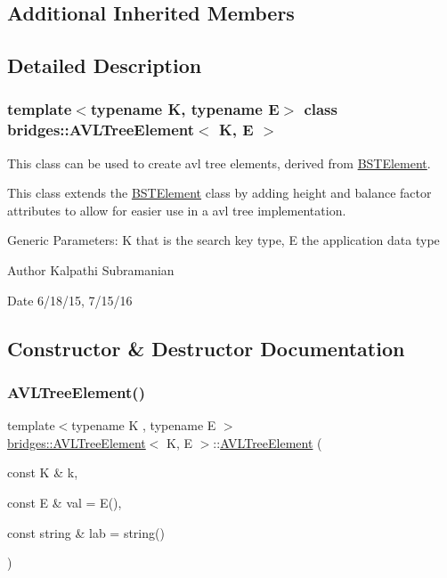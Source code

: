 \subsection*{Additional Inherited Members}


\subsection{Detailed Description}
\subsubsection*{template$<$typename K, typename E$>$\newline
class bridges\+::\+A\+V\+L\+Tree\+Element$<$ K, E $>$}

This class can be used to create avl tree elements, derived from \hyperlink{classbridges_1_1_b_s_t_element}{B\+S\+T\+Element}. 

This class extends the \hyperlink{classbridges_1_1_b_s_t_element}{B\+S\+T\+Element} class by adding height and balance factor attributes to allow for easier use in a avl tree implementation.

Generic Parameters\+: K that is the search key type, E the application data type

\begin{DoxyAuthor}{Author}
Kalpathi Subramanian 
\end{DoxyAuthor}
\begin{DoxyDate}{Date}
6/18/15, 7/15/16 
\end{DoxyDate}


\subsection{Constructor \& Destructor Documentation}
\hypertarget{classbridges_1_1_a_v_l_tree_element_a24d1dfb65f00f2fef96a57a3f869a263}{}\label{classbridges_1_1_a_v_l_tree_element_a24d1dfb65f00f2fef96a57a3f869a263} 
\subsubsection{\texorpdfstring{A\+V\+L\+Tree\+Element()}{AVLTreeElement()}}
{\footnotesize\ttfamily template$<$typename K , typename E $>$ \\
\hyperlink{classbridges_1_1_a_v_l_tree_element}{bridges\+::\+A\+V\+L\+Tree\+Element}$<$ K, E $>$\+::\hyperlink{classbridges_1_1_a_v_l_tree_element}{A\+V\+L\+Tree\+Element} (\begin{DoxyParamCaption}\item[{const K \&}]{k,  }\item[{const E \&}]{val = {\ttfamily E()},  }\item[{const string \&}]{lab = {\ttfamily string()} }\end{DoxyParamCaption})\hspace{0.3cm}{\ttfamily [inline]}}


